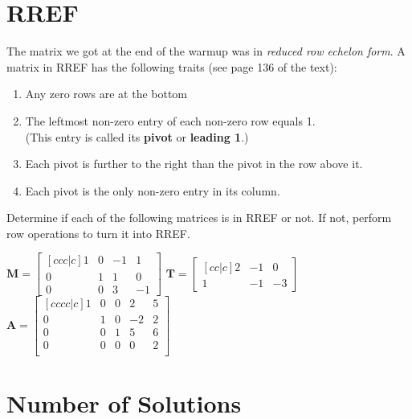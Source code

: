 \documentclass{article}
\begin{document}
\begin{flushleft}
\section{RREF}
The matrix we got at the end of the warmup was in \textit{reduced row echelon form}. A matrix in RREF has the following traits (see page 136 of the text):
\begin{enumerate}
\item Any zero rows are at the bottom
\item The leftmost non-zero entry of each non-zero row equals 1.\\
 (This entry is called its \textbf{pivot} or \textbf{leading 1}.)
\item Each pivot is further to the right than the pivot in the row above it.
\item Each pivot is the only non-zero entry in its column.\\
\end{enumerate}
Determine if each of the following matrices is in RREF or not. If not, perform row operations to turn it into RREF.\\
\vspace{0.1in}
\begin{center}
$\textbf{M}=\begin{bmatrix}[ccc|c]
1 & 0 & -1 & 1\\
0 & 1 & 1 & 0\\
0 & 0 & 3 & -1
\end{bmatrix}$
\hspace{0.15in}
$\textbf{T}=\begin{bmatrix}[cc|c]
2 & -1 & 0\\
1 & -1 & -3
\end{bmatrix}$
\hspace{0.15in}
$\textbf{A}=\begin{bmatrix}[cccc|c]
1 & 0 & 0 & 2 & 5\\
0 & 1 & 0 & -2 & 2\\
0 & 0 & 1 & 5 & 6\\
0 & 0 & 0 & 0 & 2 \\
\end{bmatrix}$\\
\end{center}

\pagebreak

\section{Number of Solutions}


\end{flushleft}
\end{document}
